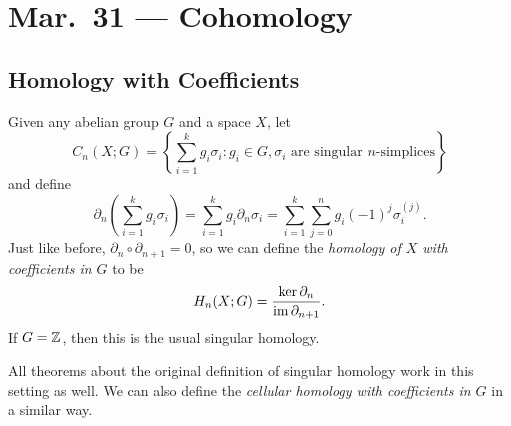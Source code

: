 \chapter{Mar.~31 --- Cohomology}

\section{Homology with Coefficients}

\begin{definition}
  Given any abelian group $G$ and a space $X$,
  let
  \[
    C_n(X; G) = \left\{
      \sum_{i = 1}^k g_i \sigma_i :
      g_i \in G, \text{$\sigma_i$ are singular $n$-simplices}
    \right\}
  \]
  and define
  \[
    \partial_n\left(\sum_{i = 1}^k g_i \sigma_i\right)
    = \sum_{i = 1}^k g_i \partial_n \sigma_i
    = \sum_{i = 1}^k \sum_{j = 0}^n g_i (-1)^j \sigma_i^{(j)}.
  \]
  Just like before, $\partial_n \circ \partial_{n + 1} = 0$, so we
  can define the \emph{homology of $X$ with
  coefficients in $G$} to be
  \[
    H_n(X; G) = \frac{\ker \partial_n}{\operatorname{im} \partial_{n + 1}}.
  \]
  If $G = \mathbb{Z}$, then this is the usual singular homology.
\end{definition}

\begin{remark}
  All theorems about the original definition of
  singular homology work in this setting as well.
  We can also define the \emph{cellular homology with coefficients in $G$}
  in a similar way.
\end{remark}

